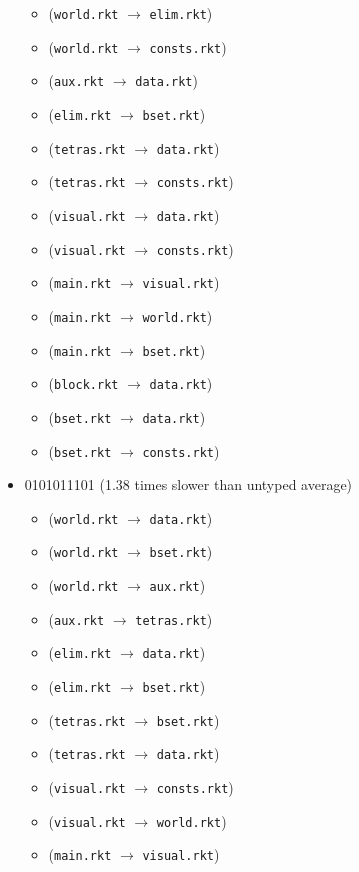 \documentclass{article}
\newcommand{\mono}[1]{\texttt{#1}}
\begin{document}
\begin{itemize}
\begin{itemize}
  \item (\mono{world.rkt} $\rightarrow$ \mono{elim.rkt})
  \item (\mono{world.rkt} $\rightarrow$ \mono{consts.rkt})
  \item (\mono{aux.rkt} $\rightarrow$ \mono{data.rkt})
  \item (\mono{elim.rkt} $\rightarrow$ \mono{bset.rkt})
  \item (\mono{tetras.rkt} $\rightarrow$ \mono{data.rkt})
  \item (\mono{tetras.rkt} $\rightarrow$ \mono{consts.rkt})
  \item (\mono{visual.rkt} $\rightarrow$ \mono{data.rkt})
  \item (\mono{visual.rkt} $\rightarrow$ \mono{consts.rkt})
  \item (\mono{main.rkt} $\rightarrow$ \mono{visual.rkt})
  \item (\mono{main.rkt} $\rightarrow$ \mono{world.rkt})
  \item (\mono{main.rkt} $\rightarrow$ \mono{bset.rkt})
  \item (\mono{block.rkt} $\rightarrow$ \mono{data.rkt})
  \item (\mono{bset.rkt} $\rightarrow$ \mono{data.rkt})
  \item (\mono{bset.rkt} $\rightarrow$ \mono{consts.rkt})
  \end{itemize}
\item 0101011101 (1.38 times slower than untyped average)
  \begin{itemize}
  \item (\mono{world.rkt} $\rightarrow$ \mono{data.rkt})
  \item (\mono{world.rkt} $\rightarrow$ \mono{bset.rkt})
  \item (\mono{world.rkt} $\rightarrow$ \mono{aux.rkt})
  \item (\mono{aux.rkt} $\rightarrow$ \mono{tetras.rkt})
  \item (\mono{elim.rkt} $\rightarrow$ \mono{data.rkt})
  \item (\mono{elim.rkt} $\rightarrow$ \mono{bset.rkt})
  \item (\mono{tetras.rkt} $\rightarrow$ \mono{bset.rkt})
  \item (\mono{tetras.rkt} $\rightarrow$ \mono{data.rkt})
  \item (\mono{visual.rkt} $\rightarrow$ \mono{consts.rkt})
  \item (\mono{visual.rkt} $\rightarrow$ \mono{world.rkt})
  \item (\mono{main.rkt} $\rightarrow$ \mono{visual.rkt})

\end{itemize}
\end{itemize}
\end{document}
